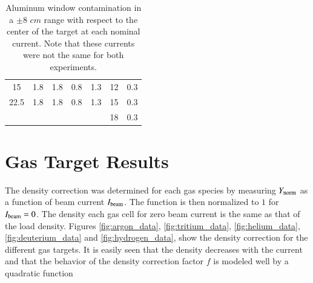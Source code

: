 \documentclass[review,numbers,sort&compress]{elsarticle}
\begin{document}
\begin{table}[h!]
\begin{tabular}{ccccc|cc}
15                                                               & 1.8                                                             & 1.8                                                              & 0.8                                                             & 1.3                                                             & 12                                                              & 0.3                                                                                \\ 
22.5                                                             & 1.8                                                             & 1.8                                                              & 0.8                                                             & 1.3                                                             & 15                                                              & 0.3                                                                                \\ 

 & & & & 
                                                                                                                                                                                                                                                                                                              & 18                                                              & 0.3                                                                                \\ \hline
\end{tabular}
\caption{Aluminum window contamination in a $\pm 8$ $cm$ range with respect to the center of the target at each nominal current. Note that these currents were not the same for both experiments.}
\label{tab:contamination_al}
\end{table}

\section{Gas Target Results}

The density correction was determined for each gas species by measuring $Y_{\rm{norm}}$ as a function of beam current $I_{\rm{beam}}$. The function is then normalized to $1$ for $I_{\rm{beam}}=0$. The density each gas cell for zero beam current is the same as that of the load density. Figures  \ref{fig:argon_data}, \ref{fig:tritium_data}, \ref{fig:helium_data}, \ref{fig:deuterium_data} and \ref{fig:hydrogen_data}, show the density correction for the different gas targets. It is easily seen that the density decreases with the current and that the behavior of the density correction factor $f$ is modeled well by a quadratic function
\end{document}
